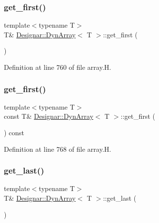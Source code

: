 \subsubsection{\texorpdfstring{get\+\_\+first()}{get\_first()}\hspace{0.1cm}{\footnotesize\ttfamily [1/2]}}
{\footnotesize\ttfamily template$<$typename T$>$ \\
T\& \hyperlink{class_designar_1_1_dyn_array}{Designar\+::\+Dyn\+Array}$<$ T $>$\+::get\+\_\+first (\begin{DoxyParamCaption}{ }\end{DoxyParamCaption})\hspace{0.3cm}{\ttfamily [inline]}}



Definition at line 760 of file array.\+H.

\mbox{\label{class_designar_1_1_dyn_array_a0b8735deaef51cfc0ff7c84994c3d838}} 
\subsubsection{\texorpdfstring{get\+\_\+first()}{get\_first()}\hspace{0.1cm}{\footnotesize\ttfamily [2/2]}}
{\footnotesize\ttfamily template$<$typename T$>$ \\
const T\& \hyperlink{class_designar_1_1_dyn_array}{Designar\+::\+Dyn\+Array}$<$ T $>$\+::get\+\_\+first (\begin{DoxyParamCaption}{ }\end{DoxyParamCaption}) const\hspace{0.3cm}{\ttfamily [inline]}}



Definition at line 768 of file array.\+H.

\mbox{\label{class_designar_1_1_dyn_array_ad69873465e7540a02fceaecc4ffc9b1e}} 
\subsubsection{\texorpdfstring{get\+\_\+last()}{get\_last()}\hspace{0.1cm}{\footnotesize\ttfamily [1/2]}}
{\footnotesize\ttfamily template$<$typename T$>$ \\
T\& \hyperlink{class_designar_1_1_dyn_array}{Designar\+::\+Dyn\+Array}$<$ T $>$\+::get\+\_\+last (\begin{DoxyParamCaption}{ }\end{DoxyParamCaption})\hspace{0.3cm}{\ttfamily [inline]}}



